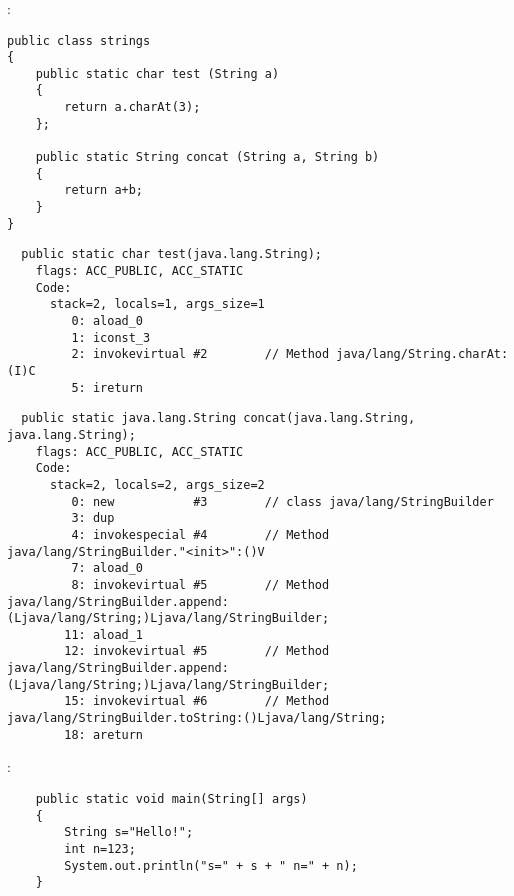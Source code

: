 \subsubsection{}

:

\begin{lstlisting}
public class strings
{
	public static char test (String a)
	{
		return a.charAt(3);
	};

	public static String concat (String a, String b)
	{
		return a+b;
	}
}
\end{lstlisting}

\begin{lstlisting}
  public static char test(java.lang.String);
    flags: ACC_PUBLIC, ACC_STATIC
    Code:
      stack=2, locals=1, args_size=1
         0: aload_0       
         1: iconst_3      
         2: invokevirtual #2        // Method java/lang/String.charAt:(I)C
         5: ireturn       
\end{lstlisting}
         

\begin{lstlisting}
  public static java.lang.String concat(java.lang.String, java.lang.String);
    flags: ACC_PUBLIC, ACC_STATIC
    Code:
      stack=2, locals=2, args_size=2
         0: new           #3        // class java/lang/StringBuilder
         3: dup           
         4: invokespecial #4        // Method java/lang/StringBuilder."<init>":()V
         7: aload_0       
         8: invokevirtual #5        // Method java/lang/StringBuilder.append:(Ljava/lang/String;)Ljava/lang/StringBuilder;
        11: aload_1       
        12: invokevirtual #5        // Method java/lang/StringBuilder.append:(Ljava/lang/String;)Ljava/lang/StringBuilder;
        15: invokevirtual #6        // Method java/lang/StringBuilder.toString:()Ljava/lang/String;
        18: areturn       
\end{lstlisting}

:

\begin{lstlisting}
	public static void main(String[] args)
	{
		String s="Hello!";
		int n=123;
		System.out.println("s=" + s + " n=" + n);
	}
\end{lstlisting}


